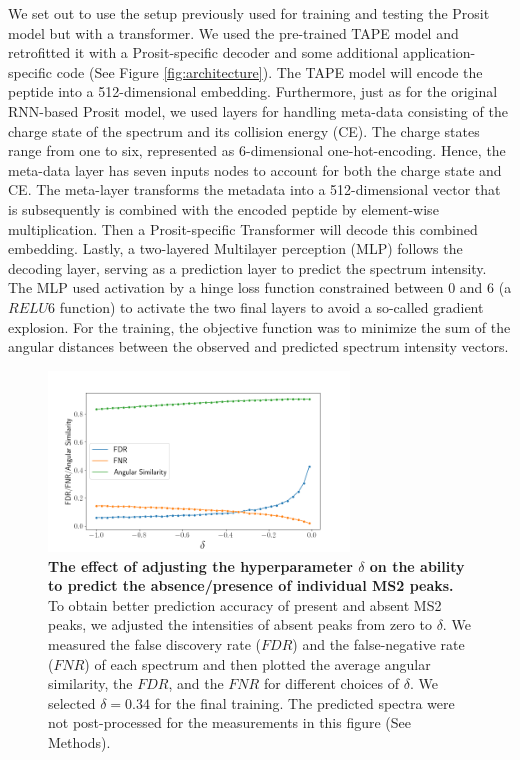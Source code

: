 \documentclass[10pt,a4paper]{article}
\begin{document}
We set out to use the setup previously used for training and testing the Prosit model but with a transformer. We used the pre-trained TAPE model \cite{Rao2019-qq} and retrofitted it with a Prosit-specific decoder and some additional application-specific code (See Figure \ref{fig:architecture}). The TAPE model will encode the peptide into a 512-dimensional embedding. Furthermore, just as for the original RNN-based Prosit model, we used layers for handling meta-data consisting of the charge state of the spectrum and its collision energy (CE). The charge states range from one to six, represented as 6-dimensional one-hot-encoding. Hence, the meta-data layer has seven inputs nodes to account for both the charge state and CE. The meta-layer transforms the metadata into a 512-dimensional vector that is subsequently is combined with the encoded peptide by element-wise multiplication. Then a Prosit-specific Transformer will decode this combined embedding. Lastly, a two-layered Multilayer perception (MLP) follows the decoding layer, serving as a prediction layer to predict the spectrum intensity. The MLP used activation by a hinge loss function constrained between 0 and 6 (a $\textit{RELU6}$ function) to activate the two final layers to avoid a so-called gradient explosion. For the training, the objective function was to minimize the sum of the angular distances between the observed and predicted spectrum intensity vectors.


\begin{figure}[htb!]
    \centering
    \includegraphics[width=8cm]{./img/compare_delta.png}
    \caption{{\bf The effect of adjusting the hyperparameter $\delta$ on the ability to predict the absence/presence of individual MS2 peaks.} To obtain better prediction accuracy of present and absent MS2 peaks, we adjusted the intensities of absent peaks from zero to $\delta$. We measured the false discovery rate ($\mathit{FDR}$) and the false-negative rate ($\mathit{FNR}$) of each spectrum and then plotted the average angular similarity, the $\mathit{FDR}$, and the $\mathit{FNR}$ for different choices of $\delta$. We selected $\delta=0.34$ for the final training.  The predicted spectra were not post-processed for the measurements in this figure (See Methods). \label{fig:delta}}
\end{figure}
    
\end{document}
